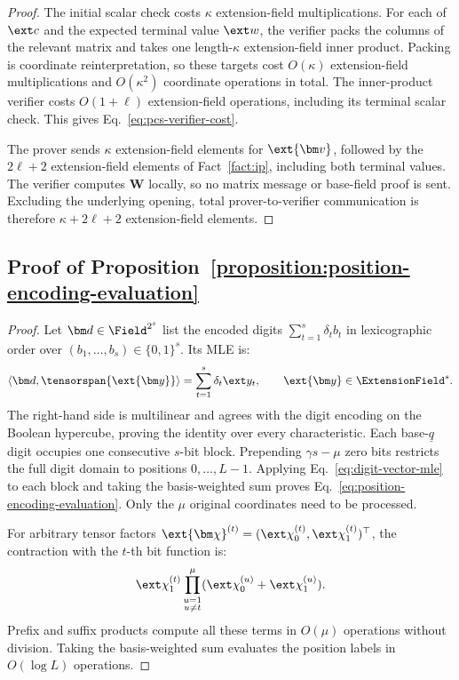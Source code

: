 \begin{proof}
The initial scalar check costs \(\kappa\) extension-field
multiplications. For each of \(\ext c\) and the expected terminal
value \(\ext w\), the verifier packs the columns of the relevant
matrix and takes one length-\(\kappa\) extension-field inner
product. Packing is coordinate reinterpretation, so these targets
cost \(O(\kappa)\) extension-field multiplications and
\(O(\kappa^2)\) coordinate operations in total.
The inner-product verifier costs \(O(1+\ell)\) extension-field
operations, including its terminal scalar check.
This gives Eq.~\eqref{eq:pcs-verifier-cost}.

The prover sends \(\kappa\) extension-field elements for
\(\ext{\bm v}\), followed by the \(2\ell+2\) extension-field
elements of Fact~\ref{fact:ip}, including both terminal values.
The verifier computes \(\bm W\) locally, so no matrix message or
base-field proof is sent. Excluding the underlying opening, total
prover-to-verifier communication is therefore
\(\kappa+2\ell+2\) extension-field elements.
\end{proof}

\subsection{Proof of Proposition~\ref{proposition:position-encoding-evaluation}}
\label{appx:proof-position-encoding}

\begin{proof}
Let \(\bm d\in\Field^{2^s}\) list the encoded digits
\(\sum_{t=1}^s\delta_tb_t\) in lexicographic order over
\((b_1,\ldots,b_s)\in\{0,1\}^s\).
Its MLE is:
\begin{equation}
    \left\langle\bm d,\tensorspan{\ext{\bm y}}\right\rangle
       =\sum_{t=1}^{s}\delta_t\ext y_t,
       \qquad \ext{\bm y}\in\ExtensionField^s.
\label{eq:digit-vector-mle}
\end{equation}
The right-hand side is multilinear and agrees with the digit
encoding on the Boolean hypercube, proving the identity over
every characteristic.
Each base-\(\underline q\) digit occupies one consecutive
\(s\)-bit block. Prepending \(\gamma s-\mu\) zero bits restricts
the full digit domain to positions \(0,\ldots,L-1\).
Applying Eq.~\eqref{eq:digit-vector-mle} to each block and taking
the basis-weighted sum proves
Eq.~\eqref{eq:position-encoding-evaluation}.
Only the \(\mu\) original coordinates need to be processed.

For arbitrary tensor factors
\(\ext{\bm\chi}^{(t)}=(\ext\chi^{(t)}_0,\ext\chi^{(t)}_1)^\top\),
the contraction with the \(t\)-th bit function is:
\[
    \ext\chi^{(t)}_1
       \prod_{\substack{u=1\\u\ne t}}^\mu
          (\ext\chi^{(u)}_0+\ext\chi^{(u)}_1).
\]
Prefix and suffix products compute all these terms in
\(O(\mu)\) operations without division. Taking the basis-weighted
sum evaluates the position labels in \(O(\log L)\) operations.
\end{proof}

